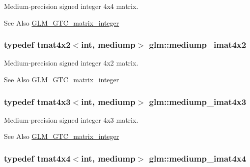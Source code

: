Medium-\/precision signed integer 4x4 matrix. \begin{DoxySeeAlso}{See Also}
\hyperlink{group__gtc__matrix__integer}{G\-L\-M\-\_\-\-G\-T\-C\-\_\-matrix\-\_\-integer} 
\end{DoxySeeAlso}
\hypertarget{group__gtc__matrix__integer_gabfe107153637dfd7a0c272ff1ba892ed}{
\subsubsection[{mediump\-\_\-imat4x2}]{\setlength{\rightskip}{0pt plus 5cm}typedef tmat4x2$<$int, mediump$>$ {\bf glm\-::mediump\-\_\-imat4x2}}}\label{group__gtc__matrix__integer_gabfe107153637dfd7a0c272ff1ba892ed}
Medium-\/precision signed integer 4x2 matrix. \begin{DoxySeeAlso}{See Also}
\hyperlink{group__gtc__matrix__integer}{G\-L\-M\-\_\-\-G\-T\-C\-\_\-matrix\-\_\-integer} 
\end{DoxySeeAlso}
\hypertarget{group__gtc__matrix__integer_ga0da8b13e141337d016a6541ea2c0362c}{
\subsubsection[{mediump\-\_\-imat4x3}]{\setlength{\rightskip}{0pt plus 5cm}typedef tmat4x3$<$int, mediump$>$ {\bf glm\-::mediump\-\_\-imat4x3}}}\label{group__gtc__matrix__integer_ga0da8b13e141337d016a6541ea2c0362c}
Medium-\/precision signed integer 4x3 matrix. \begin{DoxySeeAlso}{See Also}
\hyperlink{group__gtc__matrix__integer}{G\-L\-M\-\_\-\-G\-T\-C\-\_\-matrix\-\_\-integer} 
\end{DoxySeeAlso}
\hypertarget{group__gtc__matrix__integer_gae226af929e72730be59a58d89a4be028}{
\subsubsection[{mediump\-\_\-imat4x4}]{\setlength{\rightskip}{0pt plus 5cm}typedef tmat4x4$<$int, mediump$>$ {\bf glm\-::mediump\-\_\-imat4x4}}}\label{group__gtc__matrix__integer_gae226af929e72730be59a58d89a4be028}
